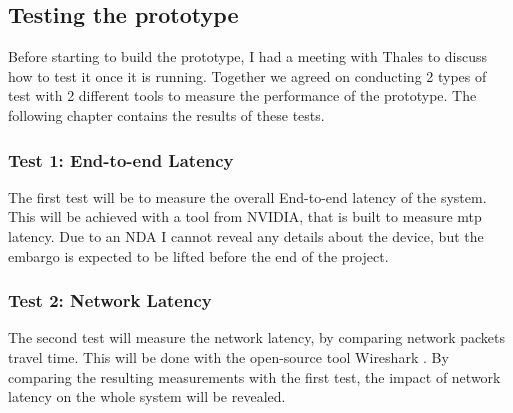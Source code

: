 \subsection{Testing the prototype}
Before starting to build the prototype, I had a meeting with Thales to discuss how to test it once it is running. Together we agreed on conducting 2 types of test with 2 different tools to measure the performance of the prototype. The following chapter contains the results of these tests.

\subsubsection{Test 1: End-to-end Latency}
The first test will be to measure the overall End-to-end latency of the system. This will be achieved with a tool from NVIDIA, that is built to measure \acrshort{mtp} latency. Due to an NDA I cannot reveal any details about the device, but the embargo is expected to be lifted before the end of the project.

\subsubsection{Test 2: Network Latency}
The second test will measure the network latency, by comparing network packets travel time. This will be done with the open-source tool Wireshark \parencite{wireshark}. By comparing the resulting measurements with the first test, the impact of network latency on the whole system will be revealed.